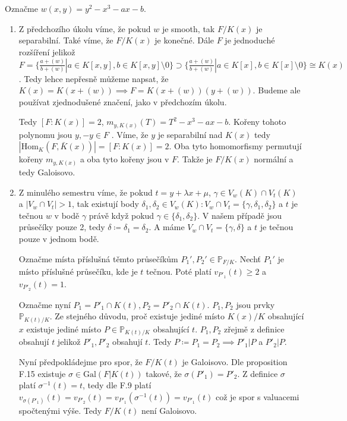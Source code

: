 \documentclass[12pt, a4paper]{article}
\begin{document}
\section{}
Označme $w(x,y)=y^2-x^3-ax-b$.
\begin{enumerate}[label=(\alph*)]
    \item Z předchozího úkolu víme, že pokud $w$ je smooth, tak $F/K(x)$ je separabilní. Také víme, že $F/K(x)$ je konečné. Dále $F$ je jednoduché rozšíření jelikož $F = \{\frac{a+(w)}{b+(w)}| a \in K[x,y], b \in K[x,y] \setminus 0 \} \supset \{\frac{a+(w)}{b+(w)}| a \in K[x], b \in K[x] \setminus 0 \} \cong K(x)$. Tedy lehce nepřesně můžeme napsat, že $K(x)=K(x+(w)) \implies F = K(x+(w))(y+(w))$. Budeme ale používat zjednodušené značení, jako v předchozím úkolu. 

    Tedy $[F:K(x)]=2$, $m_{y,K(x)}(T)=T^2 - x^3 - ax -b$. Kořeny tohoto polynomu jsou $y,-y \in F$ . Víme, že $y$ je separabilní nad $K(x)$ tedy  $|\text{Hom}_K(F,\bar{K}(x))|=[F:K(x)]=2$. Oba tyto homomorfismy permutují kořeny $m_{y,K(x)}$ a oba tyto kořeny jsou v $F$. Takže je $F/K(x)$ normální a tedy Galoisovo.

    \item Z minulého semestru víme, že pokud $t=y+\lambda x + \mu$, $\gamma \in V_w(K) \cap V_t(K)$ a $|V_w \cap V_t| > 1$, tak existují body $\delta_1, \delta_2 \in V_w(K): V_w \cap V_t =\{\gamma, \delta_1, \delta_2\}$ a $t$ je tečnou $w$ v bodě $\gamma$ právě když pokud $\gamma \in \{\delta_1,\delta_2\}$. V našem případě jsou průsečíky pouze 2, tedy $\delta \coloneqq \delta_1 = \delta_2$. A máme $V_w \cap V_t =\{\gamma, \delta\}$ a $t$ je tečnou pouze v jednom bodě.

    Označme místa příslušná těmto průsečíkům $P_1', P_2' \in \mathbb{P}_{F/K}$. Nechť $P_1'$ je místo příslušné průsečíku, kde je $t$ tečnou. Poté platí $v_{P'_1}(t) \geq 2$ a $v_{P'_2}(t) = 1$. 

    Označme nyní $P_1 = P'_1 \cap K(t), P_2 = P'_2 \cap K(t)$. $P_1, P_2$ jsou prvky $\mathbb{P}_{K(t)/K}$. Ze stejného důvodu, proč existuje jediné místo $K(x)/K$ obsahující $x$ existuje jediné místo $P \in \mathbb{P}_{K(t)/K}$ obsahující $t$. $P_1,P_2$ zřejmě z definice obsahují $t$ jelikož $P'_1, P'_2$ obsahují $t$. Tedy $P \coloneqq P_1 = P_2 \implies P'_1 | P$ a  $P'_2 | P$.

    Nyní předpokládejme pro spor, že $F/K(t)$ je Galoisovo. Dle proposition F.15 existuje $\sigma \in \text{Gal}(F|K(t))$ takové, že $\sigma(P'_1)=P'_2$. Z definice $\sigma$ platí $\sigma^{-1}(t)=t$, tedy dle F.9 platí $v_{\sigma(P'_1)}(t)=v_{P'_2}(t) = v_{P'_1}(\sigma^{-1}(t))=v_{P'_1}(t)$ což je spor s valuacemi spočtenými výše. Tedy $F/K(t)$ není Galoisovo.


\end{enumerate}
\end{document}
